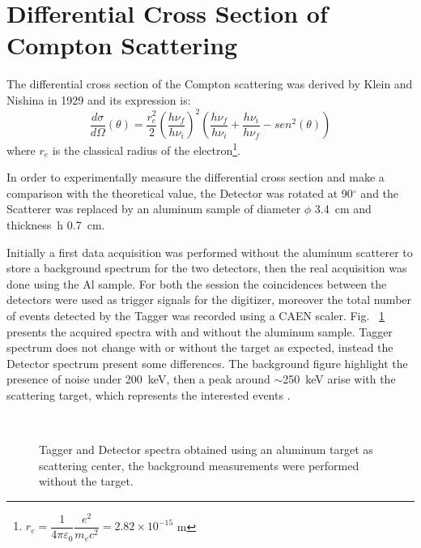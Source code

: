 \newpage
\section*{Differential Cross Section of Compton Scattering}
The differential cross section of the Compton scattering was derived by Klein and Nishina in 1929 and its expression is:
\begin{equation*}
	\frac{d\sigma}{d\Omega}(\theta)=\frac{r_e ^2}{2}\left(\frac{h \nu_f}{h \nu_i}\right)^2\left(\frac{h \nu_f}{h \nu_i}+\frac{h \nu_i}{h \nu_f}-sen^2(\theta)\right)
\end{equation*}
where $r_e$ is the classical radius of the electron\footnote{$r_e =\dfrac{1}{4\pi \varepsilon_0}\dfrac{e^2}{m_ec^2} =2.82 \times 10^{-15}$ m}.

\medskip

In order to experimentally measure the differential cross section and make a comparison with the theoretical value, the Detector was rotated at 90$^\circ$ and the Scatterer was replaced by an aluminum sample of  diameter $\phi$ 3.4~cm and thickness~h 0.7~cm.  

Initially  a first data acquisition was performed without the aluminum scatterer to store a background spectrum for the two detectors, then the real acquisition was done using the Al sample. For both the session the coincidences between the detectors were used as trigger signals for the digitizer, moreover the total number of events detected by the Tagger was recorded using a CAEN scaler. Fig.~ \ref{Fig:CrossSection_spectra} presents the acquired spectra with and without the aluminum sample. Tagger spectrum does not change with or without the target as expected, instead the Detector spectrum present some differences. The background figure highlight the presence of noise under 200~keV, then a peak around $\sim$250~keV arise with the scattering target, which represents the interested events .

\begin{figure}[h!]
	\centering
	 \quad
	 \quad
	 \quad
	\\
	\caption{Tagger and Detector spectra obtained using an aluminum target as scattering center, the background measurements were performed without the target.}
	\label{Fig:CrossSection_spectra}
\end{figure}
\newpage

